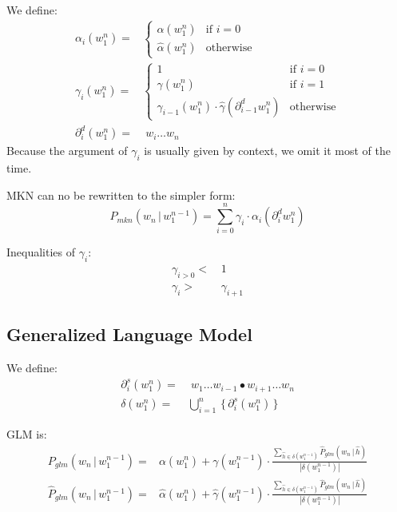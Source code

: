 \documentclass[11pt,a4paper]{article}
\newcommand\givenbase[1][]{\,#1\lvert\,}
\let\given\givenbase
\newcommand{\cardinality}[1]{|#1|}
\newcommand{\probSymbol}[1][]{P_{#1}}
\newcommand{\prob}[2][]{\probSymbol[#1](#2)}
\newcommand{\probCond}[3][]{\prob[#1]{#2 \given #3}}
\newcommand{\probSymbolLower}[1][]{\hat{P}_{#1}}
\newcommand{\probLower}[2][]{\probSymbolLower[#1](#2)}
\newcommand{\probCondLower}[3][]{\probLower[#1]{#2 \given #3}}
\begin{document}
We define:
\begin{align}
  \alpha_i(w_1^n) =&
    \begin{cases}
      \alpha(w_1^n)     & \text{if } i = 0 \\
      \hat\alpha(w_1^n) & \text{otherwise}
    \end{cases} \\
  \gamma_i(w_1^n) =&
    \begin{cases}
      1                                                                & \text{if } i = 0 \\
      \gamma(w_1^n)                                                    & \text{if } i = 1 \\
      \gamma_{i-1}(w_1^n) \cdot \hat\gamma(\partial^d_{i-1} w_1^n) & \text{otherwise}
    \end{cases} \\
  \partial^d_i(w_1^n) =& \; w_i \ldots w_n
\end{align}
Because the argument of $\gamma_i$ is usually given by context, we omit it most
of the time.

MKN can no be rewritten to the simpler form:
\begin{equation}
  \probCond[mkn]{w_n}{w_1^{n-1}} = \sum_{i=0}^n \gamma_i \cdot \alpha_i(\partial^d_i w_1^n)
\end{equation}

Inequalities of $\gamma_i$:
\begin{align}
  \gamma_{i>0} <& \, 1 \\
  \gamma_i     >& \, \gamma_{i+1}
\end{align}

\subsection{Generalized Language Model}

We define:
\begin{align}
  \partial^s_i(w_1^n) =& \; w_1 \ldots w_{i-1} \bullet w_{i+1} \ldots w_n \\
  \delta(w_1^n)             =& \bigcup_{i = 1}^n \,\{ \, \partial^s_i(w_1^n) \, \}
\end{align}

GLM is:
\begin{align}
  \probCond[glm]{w_n}{w_1^{n-1}}      =& \alpha(w_1^n) + \gamma(w_1^{n-1}) \cdot \frac{\sum_{\hat h \in \delta(w_1^{n-1})} \probCondLower[glm]{w_n}{\hat h}}{\cardinality{\delta(w_1^{n-1})}} \\
  \probCondLower[glm]{w_n}{w_1^{n-1}} =& \hat\alpha(w_1^n) + \hat\gamma(w_1^{n-1}) \cdot \frac{\sum_{\hat h \in \delta(w_1^{n-1})} \probCondLower[glm]{w_n}{\hat h}}{\cardinality{\delta(w_1^{n-1})}}
\end{align}
\end{document}
